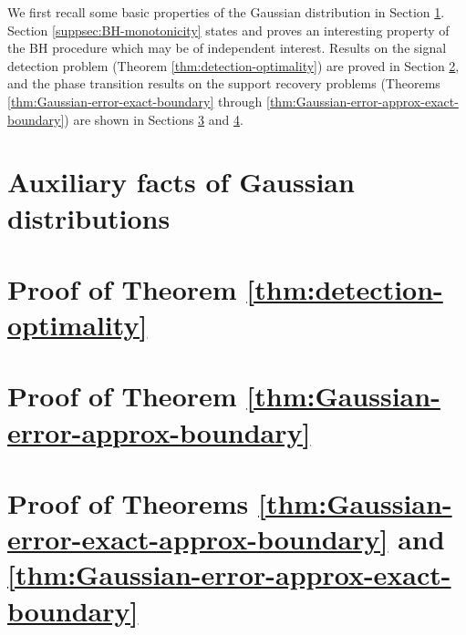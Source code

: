 
We first recall some basic properties of the Gaussian distribution in Section \ref{sec:Gaussian-distributions}.
Section \ref{suppsec:BH-monotonicity} states and proves an interesting property of the \ac{BH} procedure which may be of independent interest.
Results on the signal detection problem (Theorem \ref{thm:detection-optimality}) are proved in Section \ref{subsec:proof-additive-error-detection-boundaries}, and the phase transition results on the support recovery problems (Theorems \ref{thm:Gaussian-error-exact-boundary} through \ref{thm:Gaussian-error-approx-exact-boundary}) are shown in Sections \ref{subsec:proof-additive-error-approx-boundaries} and \ref{subsec:proof-additive-error-mix-boundaries}.


\section{Auxiliary facts of Gaussian distributions}
\label{sec:Gaussian-distributions}




\section{Proof of Theorem \ref{thm:detection-optimality}}
\label{subsec:proof-additive-error-detection-boundaries}







\section{Proof of Theorem \ref{thm:Gaussian-error-approx-boundary}}
\label{subsec:proof-additive-error-approx-boundaries}












\section{Proof of Theorems \ref{thm:Gaussian-error-exact-approx-boundary} and \ref{thm:Gaussian-error-approx-exact-boundary}}
\label{subsec:proof-additive-error-mix-boundaries}


